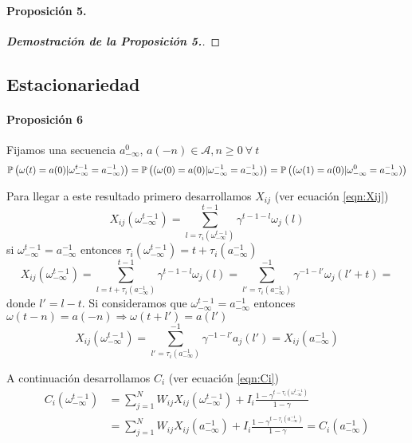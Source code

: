 \paragraph{Proposición 5.}

\begin{proof}[\bf{Demostración de la Proposición 5.}]
\end{proof}






\subsection{Estacionariedad}

\paragraph{Proposición 6} Fijamos una secuencia $a_{-\infty}^0$, $a(-n) \in \mathcal{A}, n\geq 0 \ \forall \ t$
\begin{equation}
    \mathbb{P}\left(\omega(t)=a(0) | \omega_{-\infty}^{t-1}=a_{-\infty}^{-1})\right) = 
    \mathbb{P}\left((\omega(0)=a(0) | \omega_{-\infty}^{-1}=a_{-\infty}^{-1})\right) = 
    \mathbb{P}\left((\omega(1)=a(0) | \omega_{-\infty}^{0}=a_{-\infty}^{-1})\right)
\end{equation}

Para llegar a este resultado primero desarrollamos $X_{ij}$ (ver ecuación \eqref{eqn:Xij})
\begin{equation*}
    X_{ij}(\omega_{-\infty}^{t-1}) = \sum_{l=\tau_i(\omega_{-\infty}^{t-1})}^{t-1} \gamma^{t-1-l} \omega_j(l)
\end{equation*}
si $\omega_{-\infty}^{t-1} = a_{-\infty}^{-1}$ entonces $\tau_i(\omega_{-\infty}^{t-1}) = t + \tau_i(a_{-\infty}^{-1})$
\begin{equation*}
    X_{ij}(\omega_{-\infty}^{t-1}) = 
    \sum_{l=t + \tau_i(a_{-\infty}^{-1})}^{t-1} \gamma^{t-1-l} \omega_j(l) = 
    \sum_{l'= \tau_i(a_{-\infty}^{-1})}^{-1} \gamma^{-1-l'} \omega_j(l'+t) =
\end{equation*}
donde $l'=l-t$. Si consideramos que $\omega_{-\infty}^{t-1} = a_{-\infty}^{-1}$ entonces $\omega(t-n)=a(-n) \Rightarrow \omega(t+l') = a(l')$
\begin{equation}
    X_{ij}(\omega_{-\infty}^{t-1}) = 
    \sum_{l'= \tau_i(a_{-\infty}^{-1})}^{-1} \gamma^{-1-l'} a_j(l') = X_{ij}(a_{-\infty}^{-1})
\end{equation}

A continuación desarrollamos $C_i$ (ver ecuación \eqref{eqn:Ci})
\begin{align}
\nonumber    C_i(\omega_{-\infty}^{t-1}) &= \sum_{j=1}^N W_{ij} X_{ij}(\omega_{-\infty}^{t-1}) + I_i \frac{1-\gamma^{t-\tau_i(\omega_{-\infty}^{t-1})}}{1-\gamma} \\
    &= \sum_{j=1}^N W_{ij} X_{ij}(a_{-\infty}^{-1}) + I_i \frac{1-\gamma^{t-\tau_i(a_{-\infty}^{-1})}}{1-\gamma} = C_i(a_{-\infty}^{-1})
\end{align}

